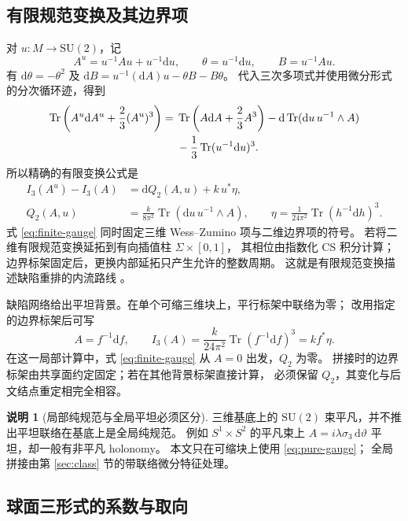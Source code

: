 \documentclass[UTF8,11pt,fontset=none]{ctexart}
\numberwithin{equation}{section}
\theoremstyle{definition}
\newtheorem{remark}[theorem]{说明}
\DeclareMathOperator{\Tr}{Tr}
\newcommand{\dd}{\mathrm d}
\newcommand{\SU}{\mathrm{SU}(2)}
\begin{document}
\subsection{有限规范变换及其边界项}

对 $u:M\to\SU$，记
\[
 A^u=u^{-1}Au+u^{-1}\dd u,\qquad
 \theta=u^{-1}\dd u,\qquad B=u^{-1}Au.
\]
有 $\dd\theta=-\theta^2$ 及
$\dd B=u^{-1}(\dd A)u-\theta B-B\theta$。
代入三次多项式并使用微分形式的分次循环迹，得到
\begin{align}
 \Tr\left(A^u\dd A^u+\frac23(A^u)^3\right)
 ={}&\Tr\left(A\dd A+\frac23A^3\right)
 -\dd\Tr(\dd u\,u^{-1}\wedge A)\notag\\
 &-\frac13\Tr(u^{-1}\dd u)^3.
 \label{eq:finite-cs-unscaled}
\end{align}
所以精确的有限变换公式是
\begin{align}
 I_3(A^u)-I_3(A)&=\dd Q_2(A,u)+k\,u^*\eta,\label{eq:finite-gauge}\\
 Q_2(A,u)&=\frac{k}{8\pi^2}\Tr(\dd u\,u^{-1}\wedge A),\qquad
 \eta=\frac1{24\pi^2}\Tr(h^{-1}\dd h)^3.\label{eq:Q2-eta}
\end{align}
式 \eqref{eq:finite-gauge} 同时固定三维 Wess--Zumino 项与二维边界项的符号。
若将二维有限规范变换延拓到有向插值柱 $\Sigma\times[0,1]$，
其相位由指数化 CS 积分计算；边界标架固定后，更换内部延拓只产生允许的整数周期。
这就是有限规范变换描述缺陷重排的内流路线 \cite[附录 E]{jia}。

缺陷网络给出平坦背景。在单个可缩三维块上，平行标架中联络为零；
改用指定的边界标架后可写
\begin{equation}
 A=f^{-1}\dd f,\qquad
 I_3(A)=\frac{k}{24\pi^2}\Tr(f^{-1}\dd f)^3=k f^*\eta.
 \label{eq:pure-gauge}
\end{equation}
在这一局部计算中，式 \eqref{eq:finite-gauge} 从 $A=0$ 出发，$Q_2$ 为零。
拼接时的边界标架由共享面约定固定；若在其他背景标架直接计算，
必须保留 $Q_2$，其变化与后文结点重定相完全相容。

\begin{remark}[局部纯规范与全局平坦必须区分]
三维基底上的 $\SU$ 束平凡，并不推出平坦联络在基底上是全局纯规范。
例如 $S^1\times S^2$ 的平凡束上
$A=i\lambda\sigma_3\,\dd\vartheta$ 平坦，却一般有非平凡 holonomy。
本文只在可缩块上使用 \eqref{eq:pure-gauge}；
全局拼接由第 \ref{sec:class} 节的带联络微分特征处理。
\end{remark}

\subsection{球面三形式的系数与取向}
\end{document}

